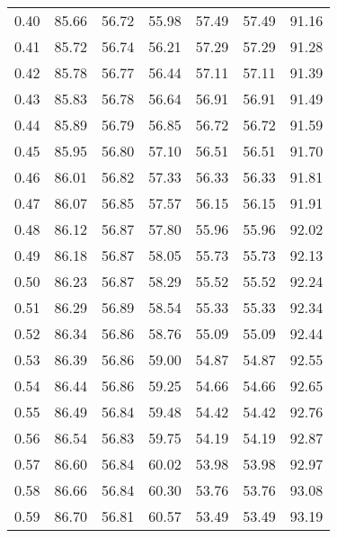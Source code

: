 \begin{tabular}{|c|c|c|c|c|c|c|}
      0.40 &     85.66 &     56.72 &      55.98 &   57.49 &      57.49 &         91.16 \\
      0.41 &     85.72 &     56.74 &      56.21 &   57.29 &      57.29 &         91.28 \\
      0.42 &     85.78 &     56.77 &      56.44 &   57.11 &      57.11 &         91.39 \\
      0.43 &     85.83 &     56.78 &      56.64 &   56.91 &      56.91 &         91.49 \\
      0.44 &     85.89 &     56.79 &      56.85 &   56.72 &      56.72 &         91.59 \\
      0.45 &     85.95 &     56.80 &      57.10 &   56.51 &      56.51 &         91.70 \\
      0.46 &     86.01 &     56.82 &      57.33 &   56.33 &      56.33 &         91.81 \\
      0.47 &     86.07 &     56.85 &      57.57 &   56.15 &      56.15 &         91.91 \\
      0.48 &     86.12 &     56.87 &      57.80 &   55.96 &      55.96 &         92.02 \\
      0.49 &     86.18 &     56.87 &      58.05 &   55.73 &      55.73 &         92.13 \\
      0.50 &     86.23 &     56.87 &      58.29 &   55.52 &      55.52 &         92.24 \\
      0.51 &     86.29 &     56.89 &      58.54 &   55.33 &      55.33 &         92.34 \\
      0.52 &     86.34 &     56.86 &      58.76 &   55.09 &      55.09 &         92.44 \\
      0.53 &     86.39 &     56.86 &      59.00 &   54.87 &      54.87 &         92.55 \\
      0.54 &     86.44 &     56.86 &      59.25 &   54.66 &      54.66 &         92.65 \\
      0.55 &     86.49 &     56.84 &      59.48 &   54.42 &      54.42 &         92.76 \\
      0.56 &     86.54 &     56.83 &      59.75 &   54.19 &      54.19 &         92.87 \\
      0.57 &     86.60 &     56.84 &      60.02 &   53.98 &      53.98 &         92.97 \\
      0.58 &     86.66 &     56.84 &      60.30 &   53.76 &      53.76 &         93.08 \\
      0.59 &     86.70 &     56.81 &      60.57 &   53.49 &      53.49 &         93.19 \\

\end{tabular}
